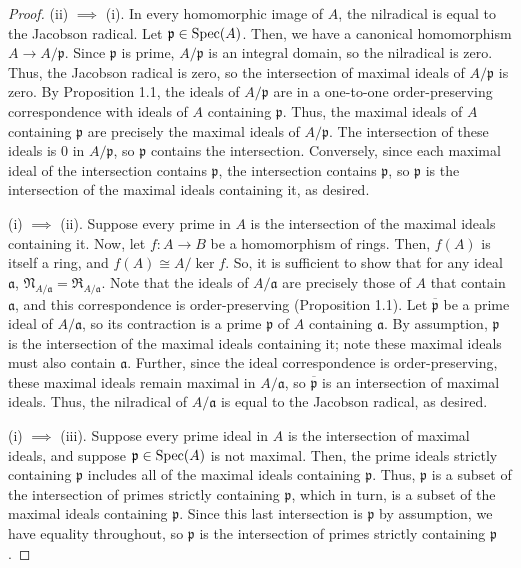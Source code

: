 \begin{proof}
(ii) $\implies$ (i). In every homomorphic image of $A$, the nilradical is equal to the Jacobson radical. Let $\mathfrak{p} \in \operatorname{Spec}(A)$. Then,
we have a canonical homomorphism $A \to A/\mathfrak{p}$. Since $\mathfrak{p}$ is prime, $A/\mathfrak{p}$ is an integral domain, so the nilradical
is zero. Thus, the Jacobson radical is zero, so the intersection of maximal ideals of $A/\mathfrak{p}$ is zero. By Proposition 1.1, the ideals of $A/\mathfrak{p}$
are in a one-to-one order-preserving correspondence with ideals of $A$ containing $\mathfrak{p}$. Thus, the maximal ideals of $A$ containing $\mathfrak{p}$
are precisely the maximal ideals of $A/\mathfrak{p}$. The intersection of these ideals is $0$ in $A/\mathfrak{p}$, so $\mathfrak{p}$ contains the intersection.
Conversely, since each maximal ideal of the intersection contains $\mathfrak{p}$, the intersection contains $\mathfrak{p}$, so $\mathfrak{p}$ is the intersection of the
maximal ideals containing it, as desired.

(i) $\implies$ (ii). Suppose every prime in $A$ is the intersection of the maximal ideals containing it. Now, let $f : A \to B$ be a homomorphism of rings.
Then, $f(A)$ is itself a ring, and $f(A) \cong A / \ker f$. So, it is sufficient to show that for any ideal $\mathfrak{a}$, 
$\mathfrak{N}_{A/\mathfrak{a}} = \mathfrak{R}_{A/\mathfrak{a}}$. Note that the ideals of $A/\mathfrak{a}$ are precisely those of $A$ that contain $\mathfrak{a}$,
and this correspondence is order-preserving (Proposition 1.1). Let $\overline{\mathfrak{p}}$ be a prime ideal of $A/\mathfrak{a}$, so its contraction is a prime 
$\mathfrak{p}$ of $A$ containing $\mathfrak{a}$. By assumption, $\mathfrak{p}$ is the intersection
of the maximal ideals containing it; note these maximal ideals must also contain $\mathfrak{a}$. Further, since the ideal correspondence is order-preserving, these
maximal ideals remain maximal in $A/\mathfrak{a}$, so $\overline{\mathfrak{p}}$ is an intersection of maximal ideals. Thus, the nilradical of $A/\mathfrak{a}$
is equal to the Jacobson radical, as desired.

(i) $\implies$ (iii). Suppose every prime ideal in $A$ is the intersection of maximal ideals, and suppose $\mathfrak{p} \in \operatorname{Spec}(A)$ is not maximal. Then, 
the prime ideals strictly containing $\mathfrak{p}$ includes all of the maximal ideals containing $\mathfrak{p}$. Thus, $\mathfrak{p}$ is a subset of
the intersection of primes strictly containing $\mathfrak{p}$, which in turn, is a subset of the maximal ideals containing $\mathfrak{p}$. Since 
this last intersection is $\mathfrak{p}$ by assumption, we have equality throughout, so $\mathfrak{p}$ is the intersection of primes strictly containing
$\mathfrak{p}$.


\end{proof}
